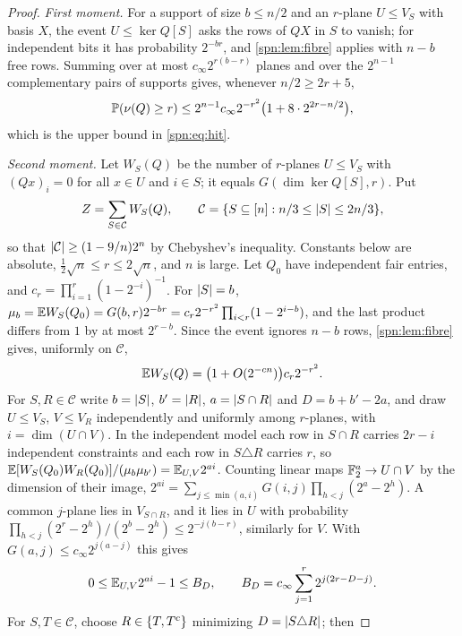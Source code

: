 \begin{proof}
\emph{First moment.} For a support of size $b\le n/2$ and an $r$-plane $U\le V_S$ with basis
$X$, the event $U\le\ker Q[S]$ asks the rows of $QX$ in $S$ to vanish; for independent bits it
has probability $2^{-br}$, and \cref{spn:lem:fibre} applies with $n-b$ free rows. Summing over
at most $c_\infty2^{r(b-r)}$ planes and over the $2^{n-1}$ complementary pairs of supports gives,
whenever $n/2\ge2r+5$,
\begin{equation}\label{spn:eq:upper}
 \mathbb{P}(\nu(Q)\ge r)\le2^{n-1}c_\infty2^{-r^2}\bigl(1+8\cdot2^{2r-n/2}\bigr),
\end{equation}
which is the upper bound in \eqref{spn:eq:hit}.

\emph{Second moment.} Let $W_S(Q)$ be the number of $r$-planes $U\le V_S$ with $(Qx)_i=0$ for
all $x\in U$ and $i\in S$; it equals $G(\dim\ker Q[S],r)$. Put
\[
 Z=\sum_{S\in\mathcal C}W_S(Q),\qquad\mathcal C=\{S\subseteq[n]:n/3\le\lvert S\rvert\le2n/3\},
\]
so that $\lvert\mathcal C\rvert\ge(1-9/n)2^n$ by Chebyshev's inequality. Constants below are
absolute, $\tfrac12\sqrt n\le r\le2\sqrt n$, and $n$ is large. Let $Q_0$ have independent fair
entries, and $c_r=\prod_{i=1}^r(1-2^{-i})^{-1}$. For $\lvert S\rvert=b$,
$\mu_b=\mathbb{E} W_S(Q_0)=G(b,r)2^{-br}=c_r2^{-r^2}\prod_{i<r}(1-2^{i-b})$, and the last product
differs from $1$ by at most $2^{r-b}$. Since the event ignores $n-b$ rows,
\cref{spn:lem:fibre} gives, uniformly on $\mathcal C$,
\begin{equation}\label{spn:eq:onecentral}
 \mathbb{E} W_S(Q)=\bigl(1+O(2^{-cn})\bigr)c_r2^{-r^2}.
\end{equation}
For $S,R\in\mathcal C$ write $b=\lvert S\rvert$, $b'=\lvert R\rvert$, $a=\lvert S\cap R\rvert$ and $D=b+b'-2a$, and
draw $U\le V_S$, $V\le V_R$ independently and uniformly among $r$-planes, with
$i=\dim(U\cap V)$. In the independent model each row in $S\cap R$ carries $2r-i$ independent
constraints and each row in $S\triangle R$ carries $r$, so
$\mathbb{E}[W_S(Q_0)W_R(Q_0)]/(\mu_b\mu_{b'})=\mathbb{E}_{U,V}2^{ai}$. Counting linear maps
$\mathbb{F}_2^a\to U\cap V$ by the dimension of their image,
$2^{ai}=\sum_{j\le\min(a,i)}G(i,j)\prod_{h<j}(2^a-2^h)$. A common $j$-plane lies in
$V_{S\cap R}$, and it lies in $U$ with probability
$\prod_{h<j}(2^r-2^h)/(2^b-2^h)\le2^{-j(b-r)}$, similarly for $V$. With
$G(a,j)\le c_\infty2^{j(a-j)}$ this gives
\begin{equation}\label{spn:eq:overlap}
 0\le\mathbb{E}_{U,V}2^{ai}-1\le B_D,\qquad B_D=c_\infty\sum_{j=1}^r2^{j(2r-D-j)}.
\end{equation}
For $S,T\in\mathcal C$, choose $R\in\{T,T^c\}$ minimizing $D=\lvert S\triangle R\rvert$; then

\end{proof}
